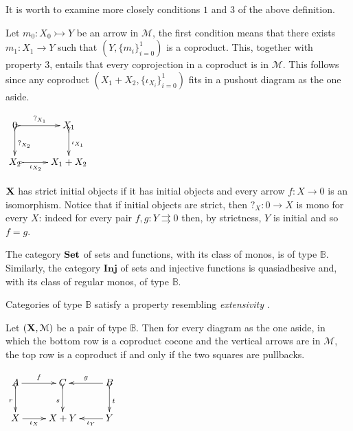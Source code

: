 \documentclass[a4paper,UKenglish,cleveref,pdftex,thm-restate,numberwithinsect]{lipics-v2021}
\def\X{\textbf {\textup{X}}}
\def\Set{\textbf {\textup{Set}}}
\begin{document}
\begin{remark}
	It is worth to examine more closely conditions $1$ and $3$ of the above definition.
	\smallskip 
	\begin{itemize}
	\parbox{10.3cm}{\item Let $m_0\colon X_0 \rightarrowtail Y$ be an arrow in $\mathcal{M}$, the first condition means that there exists $m_1\colon X_1\to Y$ such that $(Y, \{m_i\}_{i=0}^1)$ is a coproduct. This, together with property $3$, entails that every coprojection in a coproduct is in $\mathcal{M}$. This follows since any coproduct $(X_1+X_2, \{\iota_{X_i}\}_{i=0}^1)$ fits in a pushout diagram as the one aside.}
	  \parbox{3cm}{\vspace{-0em}$\xymatrix@C=25pt{0  \ar@{>->}[r]^-{?_{X_1}} \ar@{>->}[d]^{?_{X_2}}& X_1 \ar@{>->}[d]^{\iota_{X_1}}\\ X_2 \ar@{>->}[r]_-{\iota_{X_2}} & X_1+X_2}$}
		
	\smallskip 	\noindent 
	\parbox{13.5cm}{\item $\X$ has strict initial objects if it has initial objects and every arrow $f:X\to 0$ is an isomorphism. Notice that if initial objects are strict, then $?_X\colon 0\to X$ is mono for every $X$: indeed for every pair $f,g\colon Y\rightrightarrows 0$ then, by strictness, $Y$ is initial and so $f=g$.}
	\end{itemize} 
\end{remark}

\begin{example}
The category $\Set$ of sets and functions, with its class of monos, is of type $\mathbb{B}$. Similarly, the category $\textbf{Inj}$ of sets and injective functions is quasiadhesive and, with its class of regular monos, of type $\mathbb{B}$. 
\end{example}

Categories of type $\mathbb{B}$ satisfy a property resembling \emph{extensivity} \cite{carboni1993introduction}.

\noindent
\parbox{10cm}{\begin{proposition}\label{prop:ext}
Let $(\X, \mathcal{M})$ be a pair of type $\mathbb{B}$. Then for every diagram as the one aside, in which the bottom row is a coproduct cocone and the vertical arrows are in $\mathcal{M}$, the top row is a coproduct if and only if the two squares are pullbacks.
\end{proposition}}
\parbox{2cm}{\vspace{-.4em}$\xymatrix{A\ar[r]^-{f} \ar@{>->}[d]_{r}& C  \ar@{>->}[d]_{s}& B \ar@{>->}[d]^{t}\ar[l]_-{g}\\X  \ar[r]_-{\iota_X}& X+Y & Y \ar[l]^-{\iota_Y}}$}
\end{document}
